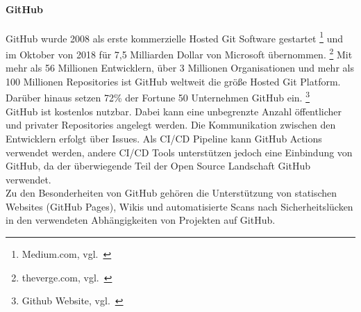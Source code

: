 \paragraph{GitHub}\label{collaboration_github}

GitHub wurde 2008 als erste kommerzielle Hosted Git Software gestartet \footnote{Medium.com, vgl.~\cite{GITHUB_STORY}}
und im Oktober von 2018 für 7,5 Milliarden Dollar von Microsoft übernommen. \footnote{theverge.com, vgl.~\cite{GITHUB_MICROSOFT}}
Mit mehr als 56 Millionen Entwicklern, über 3 Millionen Organisationen und mehr als 100 Millionen Repositories ist GitHub
weltweit die größe Hosted Git Platform.
Darüber hinaus setzen 72\% der Fortune 50 Unternehmen GitHub ein. \footnote{Github Website, vgl.~\cite{GITHUB_HOME}} \\

GitHub ist kostenlos nutzbar.
Dabei kann eine unbegrenzte Anzahl öffentlicher und privater Repositories angelegt werden.
Die Kommunikation zwischen den Entwicklern erfolgt über Issues.
Als CI/CD Pipeline kann GitHub Actions verwendet werden, andere CI/CD Tools unterstützen jedoch eine Einbindung von GitHub,
da der überwiegende Teil der Open Source Landschaft GitHub verwendet. \\

Zu den Besonderheiten von GitHub gehören die Unterstützung von statischen Websites (GitHub Pages), Wikis und
automatisierte Scans nach Sicherheitslücken in den verwendeten Abhängigkeiten von Projekten auf GitHub.


